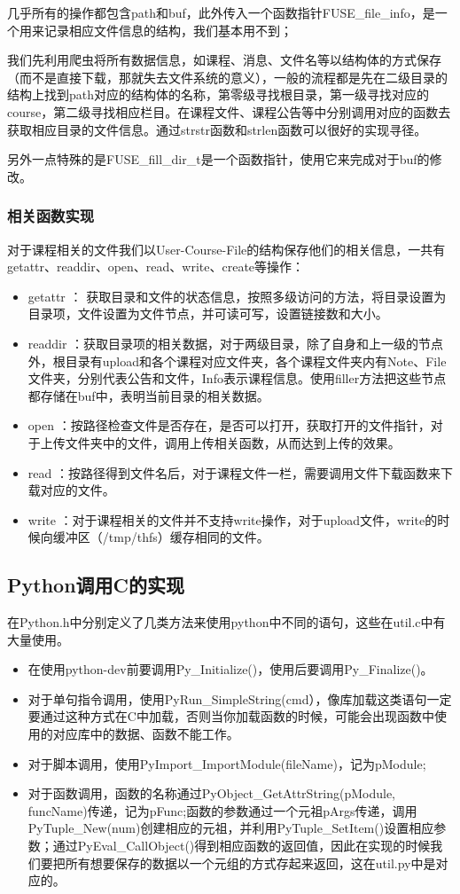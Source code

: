几乎所有的操作都包含path和buf，此外传入一个函数指针FUSE\_file\_info，是一个用来记录相应文件信息的结构，我们基本用不到；

我们先利用爬虫将所有数据信息，如课程、消息、文件名等以结构体的方式保存（而不是直接下载，那就失去文件系统的意义），一般的流程都是先在二级目录的结构上找到path对应的结构体的名称，第零级寻找根目录，第一级寻找对应的course，第二级寻找相应栏目。在课程文件、课程公告等中分别调用对应的函数去获取相应目录的文件信息。通过strstr函数和strlen函数可以很好的实现寻径。

另外一点特殊的是FUSE\_fill\_dir\_t是一个函数指针，使用它来完成对于buf的修改。

\subsubsection{相关函数实现}
对于课程相关的文件我们以User-Course-File的结构保存他们的相关信息，一共有getattr、readdir、open、read、write、create等操作：

\begin{itemize}
\item getattr ： 获取目录和文件的状态信息，按照多级访问的方法，将目录设置为目录项，文件设置为文件节点，并可读可写，设置链接数和大小。
\item readdir ：获取目录项的相关数据，对于两级目录，除了自身和上一级的节点外，根目录有upload和各个课程对应文件夹，各个课程文件夹内有Note、File文件夹，分别代表公告和文件，Info表示课程信息。使用filler方法把这些节点都存储在buf中，表明当前目录的相关数据。
\item open ：按路径检查文件是否存在，是否可以打开，获取打开的文件指针，对于上传文件夹中的文件，调用上传相关函数，从而达到上传的效果。
\item read ：按路径得到文件名后，对于课程文件一栏，需要调用文件下载函数来下载对应的文件。
\item write ：对于课程相关的文件并不支持write操作，对于upload文件，write的时候向缓冲区（/tmp/thfs）缓存相同的文件。
\end{itemize}

\subsection{Python调用C的实现}
在Python.h中分别定义了几类方法来使用python中不同的语句，这些在util.c中有大量使用。

\begin{itemize}
\item 在使用python-dev前要调用Py\_Initialize()，使用后要调用Py\_Finalize()。
\item 对于单句指令调用，使用PyRun\_SimpleString(cmd），像库加载这类语句一定要通过这种方式在C中加载，否则当你加载函数的时候，可能会出现函数中使用的对应库中的数据、函数不能工作。
\item 对于脚本调用，使用PyImport\_ImportModule(fileName)，记为pModule;
\item 对于函数调用，函数的名称通过PyObject\_GetAttrString(pModule, funcName)传递，记为pFunc;函数的参数通过一个元祖pArgs传递，调用PyTuple\_New(num)创建相应的元祖，并利用PyTuple\_SetItem()设置相应参数；通过PyEval\_CallObject()得到相应函数的返回值，因此在实现的时候我们要把所有想要保存的数据以一个元组的方式存起来返回，这在util.py中是对应的。
\end{itemize}

